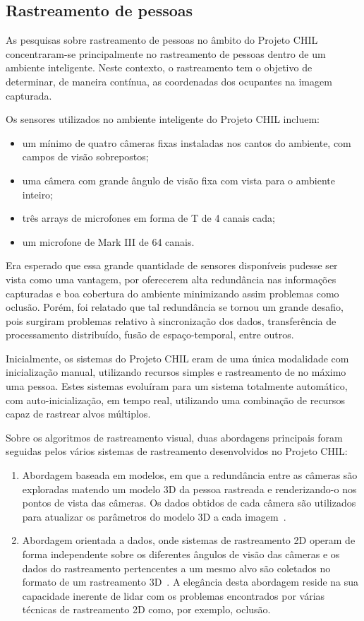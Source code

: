 \subsection{Rastreamento de pessoas}

As pesquisas sobre rastreamento de pessoas no âmbito do Projeto CHIL concentraram-se principalmente no rastreamento de pessoas dentro de um ambiente inteligente. Neste contexto, o rastreamento tem o objetivo de determinar,  de maneira contínua, as coordenadas dos ocupantes na imagem capturada.

Os sensores utilizados no ambiente inteligente do Projeto CHIL incluem:	
	\begin{itemize}
		\item um mínimo de quatro câmeras fixas instaladas nos cantos do ambiente, com campos de visão sobrepostos;
		\item uma câmera com grande ângulo de visão fixa com vista para o ambiente inteiro;
		\item três arrays de microfones em forma de T de 4 canais cada;
		\item um microfone de Mark III de 64 canais.
	\end{itemize}

Era esperado que essa grande quantidade de sensores disponíveis pudesse ser vista como uma vantagem, por oferecerem alta redundância nas informações capturadas e boa cobertura do ambiente minimizando assim problemas como oclusão. Porém, foi relatado que tal redundância se tornou um grande desafio, pois surgiram problemas relativo à sincronização dos dados, transferência de processamento distribuído, fusão de espaço-temporal, entre outros.

Inicialmente, os sistemas do Projeto CHIL eram de uma única modalidade com inicialização manual, utilizando recursos simples e rastreamento de no máximo uma pessoa. Estes sistemas evoluíram para um sistema totalmente automático, com auto-inicialização, em tempo real, utilizando uma combinação de recursos capaz de rastrear alvos múltiplos.

Sobre os algoritmos de rastreamento visual, duas abordagens principais foram seguidas pelos vários sistemas de rastreamento desenvolvidos no Projeto CHIL:

	\begin{enumerate}
		\item Abordagem baseada em modelos, em que a redundância entre as câmeras são exploradas matendo um modelo 3D da pessoa rastreada e renderizando-o nos pontos de vista das câmeras. Os dados obtidos de cada câmera são utilizados para atualizar os parâmetros do modelo 3D a cada imagem~\cite{chilref1,chilref2,chilref3}. 
		\item Abordagem orientada a dados, onde sistemas de rastreamento 2D operam de forma independente sobre os diferentes ângulos de visão das câmeras e os dados do rastreamento pertencentes a um mesmo alvo são coletados no formato de um rastreamento 3D~\cite{chilref4,chilref5}. A elegância desta abordagem reside na sua capacidade inerente de lidar com os problemas encontrados por várias técnicas de rastreamento 2D como, por exemplo, oclusão.
	\end{enumerate}	

